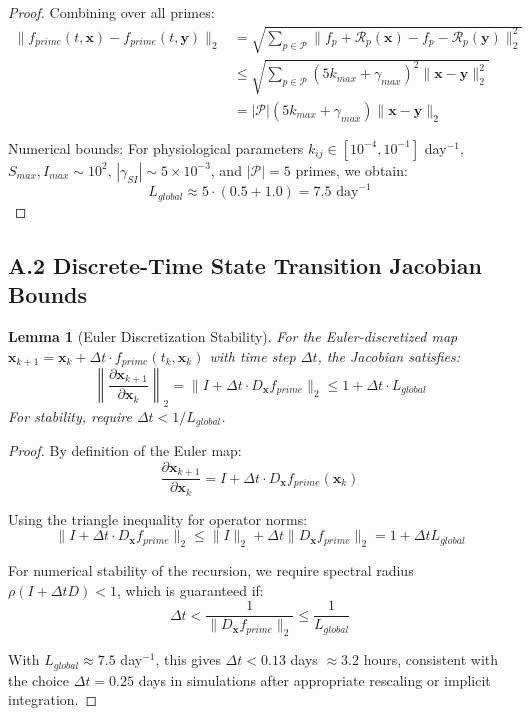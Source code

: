 \documentclass[11pt,letterpaper]{article}
\newtheorem{lemma}[theorem]{Lemma}
\begin{document}
\begin{proof}
Combining over all primes:
\begin{align*}
\|f_{prime}(t, \mathbf{x}) - f_{prime}(t, \mathbf{y})\|_2 &= \sqrt{\sum_{p \in \mathcal{P}} \|f_p + \mathcal{R}_p(\mathbf{x}) - f_p - \mathcal{R}_p(\mathbf{y})\|_2^2} \\
&\leq \sqrt{\sum_{p \in \mathcal{P}} (5k_{max} + \gamma_{max})^2 \|\mathbf{x} - \mathbf{y}\|_2^2} \\
&= |\mathcal{P}| (5k_{max} + \gamma_{max}) \|\mathbf{x} - \mathbf{y}\|_2
\end{align*}

Numerical bounds: For physiological parameters $k_{ij} \in [10^{-4}, 10^{-1}]$ day$^{-1}$, $S_{max}, I_{max} \sim 10^2$, $|\gamma_{SI}| \sim 5 \times 10^{-3}$, and $|\mathcal{P}| = 5$ primes, we obtain:
\[
L_{global} \approx 5 \cdot (0.5 + 1.0) = 7.5 \text{ day}^{-1}
\]
\end{proof}

\subsection*{A.2 Discrete-Time State Transition Jacobian Bounds}

\begin{lemma}[Euler Discretization Stability]
For the Euler-discretized map $\mathbf{x}_{k+1} = \mathbf{x}_k + \Delta t \cdot f_{prime}(t_k, \mathbf{x}_k)$ with time step $\Delta t$, the Jacobian satisfies:
\[
\left\| \frac{\partial \mathbf{x}_{k+1}}{\partial \mathbf{x}_k} \right\|_2 = \|I + \Delta t \cdot D_{\mathbf{x}} f_{prime}\|_2 \leq 1 + \Delta t \cdot L_{global}
\]
For stability, require $\Delta t < 1/L_{global}$.
\end{lemma}

\begin{proof}
By definition of the Euler map:
\[
\frac{\partial \mathbf{x}_{k+1}}{\partial \mathbf{x}_k} = I + \Delta t \cdot D_{\mathbf{x}} f_{prime}(\mathbf{x}_k)
\]

Using the triangle inequality for operator norms:
\[
\|I + \Delta t \cdot D_{\mathbf{x}} f_{prime}\|_2 \leq \|I\|_2 + \Delta t \|D_{\mathbf{x}} f_{prime}\|_2 = 1 + \Delta t L_{global}
\]

For numerical stability of the recursion, we require spectral radius $\rho(I + \Delta t D) < 1$, which is guaranteed if:
\[
\Delta t < \frac{1}{\|D_{\mathbf{x}} f_{prime}\|_2} \leq \frac{1}{L_{global}}
\]

With $L_{global} \approx 7.5$ day$^{-1}$, this gives $\Delta t < 0.13$ days $\approx 3.2$ hours, consistent with the choice $\Delta t = 0.25$ days in simulations after appropriate rescaling or implicit integration.
\end{proof}
\end{document}
